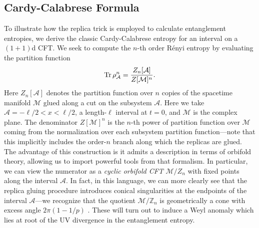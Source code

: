 \documentclass{report}
\begin{document}
\subsection{Cardy-Calabrese Formula}
To illustrate how the replica trick is employed to calculate entanglement 
entropies, we derive the classic Cardy-Calabrese entropy for an interval 
on a $(1+1)$d CFT. We seek to compute the $ n $-th order R\'enyi entropy by 
evaluating the partition function 
\begin{equation}\label{eq:entanglement-renyi-partition}
	\Tr \rho^n_\mathcal{A} = \frac{Z_n[\mathcal{A}]}{Z[\mathcal{M}]^n}.
\end{equation}
Here $ Z_n [\mathcal{A}] $ denotes the partition function over $ n $ copies 
of the spacetime manifold $ \mathcal{M} $ glued along a cut on the subsystem $
\mathcal{A} $. Here we take $ \mathcal{A} = -\ell/2 < x < \ell / 2 $, a length-$
\ell $ interval at $ t=0 $, and $ \mathcal{M} $ is the complex plane. The
denominator $ Z[\mathcal{M}]^n $ is the $ n $-th power of partition function
over $ \mathcal{M} $ coming from the normalization over each subsystem partition 
function---note that this implicitly includes the order-$ n $ branch along which 
the replicas are glued. The advantage of this construction is it admits a
description in terms of orbifold theory, allowing us to import powerful tools
from that formalism. In particular, we can view the numerator as a \textit{cyclic
orbifold CFT} $ \mathcal{M}/Z_n $ with fixed points along the interval $
\mathcal{A} $. In fact, in this language, we can more clearly see that the replica 
gluing procedure introduces conical singularities at the endpoints of the interval 
$ \mathcal{A} $---we recognize that the quotient $
\mathcal{M}/\mathbb{Z}_n $ is geometrically a cone with excess angle $ 2\pi
(1-1/p) $ . These will turn out to induce a Weyl anomaly  
which lies at root of the UV divergence in the entanglement entropy.
\end{document}
